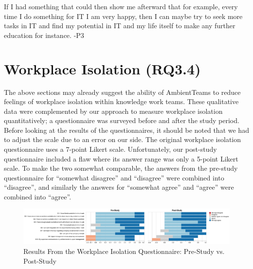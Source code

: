 \begin{displayquote}
    If I had something that could then show me afterward that for example, every time I do something for IT I am very happy, then I can maybe try to seek more tasks in IT and find my potential in IT and my life itself to make any further education for instance. -P3
\end{displayquote}

\section{Workplace Isolation (RQ3.4)}
\label{section:workplace_isolation}

The above sections may already suggest the ability of AmbientTeams to reduce feelings of workplace isolation within knowledge work teams. These qualitative data were complemented by our approach to measure workplace isolation quantitatively; a questionnaire was surveyed before and after the study period. Before looking at the results of the questionnaires, it should be noted that we had to adjust the scale due to an error on our side. The original workplace isolation questionnaire uses a 7-point Likert scale. Unfortunately, our post-study questionnaire included a flaw where its answer range was only a 5-point Likert scale. To make the two somewhat comparable, the answers from the pre-study questionnaire for \enquote{somewhat disagree} and \enquote{disagree} were combined into \enquote{disagree}, and similarly the answers for \enquote{somewhat agree} and \enquote{agree} were combined into \enquote{agree}.

\begin{figure}[h]
    \centering
    \includegraphics[width=\linewidth]{plots/workplace_isolation_likert.pdf}
    \caption{Results From the Workplace Isolation Questionnaire: Pre-Study vs. Post-Study}
    \label{fig:workplace_isolation}
\end{figure}

